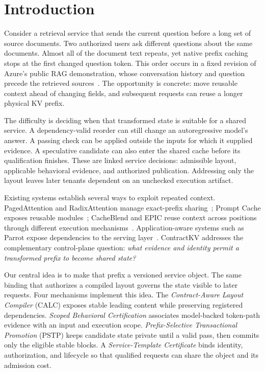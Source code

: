 \section{Introduction}
\label{sec:introduction}

Consider a retrieval service that sends the current question before a long set of source documents. Two authorized users ask different questions about the same documents. Almost all of the document text repeats, yet native prefix caching stops at the first changed question token. This order occurs in a fixed revision of Azure's public RAG demonstration, whose conversation history and question precede the retrieved sources~\cite{azuretemplate}. The opportunity is concrete: move reusable context ahead of changing fields, and subsequent requests can reuse a longer physical KV prefix.

The difficulty is deciding when that transformed state is suitable for a shared service. A dependency-valid reorder can still change an autoregressive model's answer. A passing check can be applied outside the inputs for which it supplied evidence. A speculative candidate can also enter the shared cache before its qualification finishes. These are linked service decisions: admissible layout, applicable behavioral evidence, and authorized publication. Addressing only the layout leaves later tenants dependent on an unchecked execution artifact.

Existing systems establish several ways to exploit repeated context. PagedAttention and RadixAttention manage exact-prefix sharing~\cite{vllm2023,sglang2024}; Prompt Cache exposes reusable modules~\cite{promptcache2024}; CacheBlend and EPIC reuse context across positions through different execution mechanisms~\cite{cacheblend2025,epic2025}. Application-aware systems such as Parrot expose dependencies to the serving layer~\cite{parrot2024}. ContractKV addresses the complementary control-plane question: \emph{what evidence and identity permit a transformed prefix to become shared state?}

Our central idea is to make that prefix a versioned service object. The same binding that authorizes a compiled layout governs the state visible to later requests. Four mechanisms implement this idea. The \emph{Contract-Aware Layout Compiler} (CALC) exposes stable leading content while preserving registered dependencies. \emph{Scoped Behavioral Certification} associates model-backed token-path evidence with an input and execution scope. \emph{Prefix-Selective Transactional Promotion} (PSTP) keeps candidate state private until a valid pass, then commits only the eligible stable blocks. A \emph{Service-Template Certificate} binds identity, authorization, and lifecycle so that qualified requests can share the object and its admission cost.


